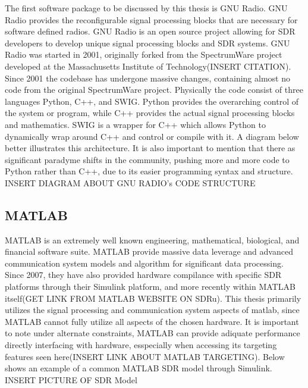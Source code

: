 The first software package to be discussed by this thesis is GNU Radio.  GNU Radio provides the reconfigurable signal processing blocks that are necessary for software defined radios. GNU Radio is an open source project allowing for SDR developers to develop unique signal processing blocks and SDR systems.  GNU Radio was started in 2001, originally forked from the SpectrumWare project developed at the Massachusetts Institute of Technology(INSERT CITATION).  Since 2001 the codebase has undergone massive changes, containing almost no code from the original SpectrumWare project.  Physically the code consist of three languages Python, C++, and SWIG.  Python provides the overarching control of the system or program, while C++ provides the actual signal processing blocks and mathematics.  SWIG is a wrapper for C++ which allows Python to dynamically wrap around C++ and control or compile with it.  A diagram below better illustrates this architecture.  It is also important to mention that there as significant paradyme shifts in the community, pushing more and more code to Python rather than C++, due to its easier programming syntax and structure.\\

INSERT DIAGRAM ABOUT GNU RADIO's CODE STRUCTURE\\

\subsection{MATLAB}

MATLAB is an extremely well known engineering, mathematical, biological, and financial software suite.  MATLAB provide massive data leverage and advanced communication system models and algorithm for significant data processing.  Since 2007, they have also provided hardware compilance with specific SDR platforms through their Simulink platform, and more recently within MATLAB itself(GET LINK FROM MATLAB WEBSITE ON SDRu).  This thesis primarily utilizes the signal processing and communication system aspects of matlab, since MATLAB cannot fully utilize all aspects of the chosen hardware.  It is important to note under alternate constraints, MATLAB can provide adiquate performance directly interfacing with hardware, esspecially when accessing its targeting features seen here(INSERT LINK ABOUT MATLAB TARGETING).  Below shows an example of a common MATLAB SDR model through Simulink.\\

INSERT PICTURE OF SDR Model\\

